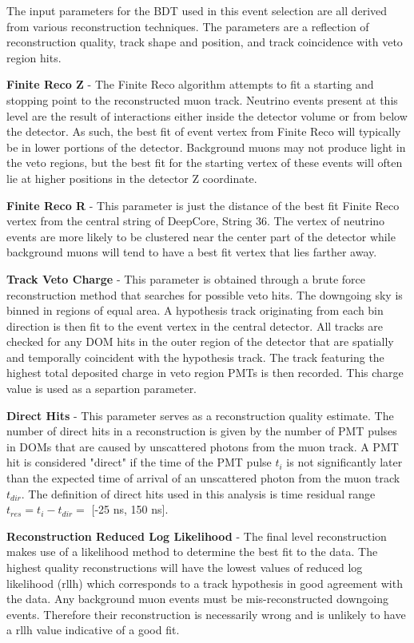 \documentclass{gatech-thesis}
\begin{document}
The input parameters for the BDT used in this event selection are all derived from various reconstruction techniques. The parameters are a reflection of reconstruction quality, track shape and position, and track coincidence with veto region hits.
\begin{adjustwidth}{2.5em}{2.5em}
\setlength{\parindent}{0pt}
\textbf{Finite Reco Z} - The Finite Reco algorithm attempts to fit a starting and stopping point to the reconstructed muon track. Neutrino events present at this level are the result of interactions either inside the detector volume or from below the detector. As such, the best fit of event vertex from Finite Reco will typically be in lower portions of the detector. Background muons may not produce light in the veto regions, but the best fit for the starting vertex of these events will often lie at higher positions in the detector Z coordinate.

\textbf{Finite Reco R} - This parameter is just the distance of the best fit Finite Reco vertex from the central string of DeepCore, String 36. The vertex of neutrino events are more likely to be clustered near the center part of the detector while background muons will tend to have a best fit vertex that lies farther away.

\textbf{Track Veto Charge} - This parameter is obtained through a brute force reconstruction method that searches for possible veto hits. The downgoing sky is binned in regions of equal area. A hypothesis track originating from each bin direction is then fit to the event vertex in the central detector. All tracks are checked for any DOM hits in the outer region of the detector that are spatially and temporally coincident with the hypothesis track. The track featuring the highest total deposited charge in veto region PMTs is then recorded. This charge value is used as a separtion parameter.

\textbf{Direct Hits} - This parameter serves as a reconstruction quality estimate. The number of direct hits in a reconstruction is given by the number of PMT pulses in DOMs that are caused by unscattered photons from the muon track. A PMT hit is considered "direct" if the time of the PMT pulse $t_i$ is not significantly later than the expected time of arrival of an unscattered photon from the muon track $t_{dir}$. The definition of direct hits used in this analysis is time residual range $t_{res} = t_{i} - t_{dir} =$ [-25 ns, 150 ns].

\textbf{Reconstruction Reduced Log Likelihood} - The final level reconstruction makes use of a likelihood method to determine the best fit to the data. The highest quality reconstructions will have the lowest values of reduced log likelihood (rllh) which corresponds to a track hypothesis in good agreement with the data. Any background muon events must be mis-reconstructed downgoing events. Therefore their reconstruction is necessarily wrong and is unlikely to have a rllh value indicative of a good fit.


\end{adjustwidth}
\end{document}
